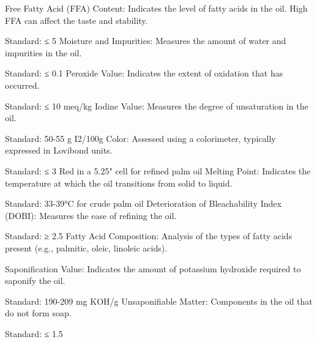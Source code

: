 Free Fatty Acid (FFA) Content: Indicates the level of fatty acids in the oil. High FFA can affect the taste and stability.

Standard: ≤ 5%
Moisture and Impurities: Measures the amount of water and impurities in the oil.

Standard: ≤ 0.1%
Peroxide Value: Indicates the extent of oxidation that has occurred.

Standard: ≤ 10 meq/kg
Iodine Value: Measures the degree of unsaturation in the oil.

Standard: 50-55 g I2/100g
Color: Assessed using a colorimeter, typically expressed in Lovibond units.

Standard: ≤ 3 Red in a 5.25" cell for refined palm oil
Melting Point: Indicates the temperature at which the oil transitions from solid to liquid.

Standard: 33-39°C for crude palm oil
Deterioration of Bleachability Index (DOBI): Measures the ease of refining the oil.

Standard: ≥ 2.5
Fatty Acid Composition: Analysis of the types of fatty acids present (e.g., palmitic, oleic, linoleic acids).

Saponification Value: Indicates the amount of potassium hydroxide required to saponify the oil.

Standard: 190-209 mg KOH/g
Unsaponifiable Matter: Components in the oil that do not form soap.

Standard: ≤ 1.5%